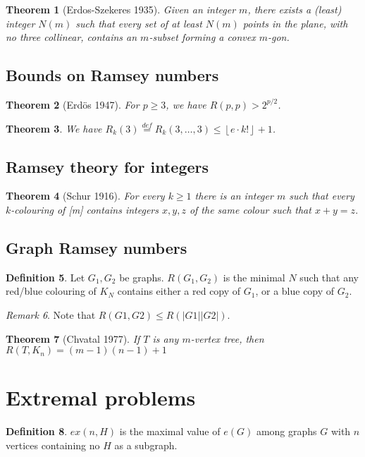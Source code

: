 \documentclass[11pt, fleqn, a4paper, landscape]{article}
\theoremstyle{plain} %
\newtheorem{thm}{Theorem}
\theoremstyle{remark} %
\newtheorem{rem}[thm]{Remark}
\theoremstyle{definition} %
\newtheorem{defi}[thm]{Definition}
\begin{document}
\begin{multicols}{3}
\begin{thm}[Erdos-Szekeres 1935]
Given an integer $m$, there exists a (least) integer $N(m)$ such
that every set of at least $N(m)$ points in the plane, with no three collinear, contains an $m$-subset forming a convex $m$-gon.
\end{thm}
\subsection{Bounds on Ramsey numbers}

\begin{thm}[Erdös 1947]
For $p \ge 3$, we have $R(p, p) > 2^{p/2}$.
\end{thm}

\begin{thm}
We have $R_k(3)\stackrel{def}{=}R_k(3,\dots,3)\le\left\lfloor e\cdot k!\right\rfloor+1$.
\end{thm}

\subsection{Ramsey theory for integers}

\begin{thm}[Schur 1916]
For every $k \ge 1$ there is an integer $m$ such that every $k$-colouring of [m] contains integers $x, y, z$ of the same colour such that $x + y = z.$
\end{thm}

\subsection{Graph Ramsey numbers}
\begin{defi}
Let $G_1,G_2$ be graphs. $R(G_1,G_2)$ is the minimal $N$ such that any red/blue colouring of $K_N$ contains either a red copy of $G_1$, or a blue copy of $G_2$.
\end{defi}

\begin{rem}
Note that $R(G1,G2) \le R(|G1||G2|)$.
\end{rem}

\begin{thm}[Chvatal 1977]
If $T$ is any $m$-vertex tree, then $R(T,K_n) = (m - 1)(n - 1) + 1$
\end{thm}

\section{Extremal problems}
\addtocounter{thm}{1}
\begin{defi}
$ex(n,H)$ is the maximal value of $e(G)$ among graphs $G$ with $n$ vertices containing no $H$ as a subgraph.
\end{defi}
\addtocounter{thm}{1}

\end{multicols}
\end{document}
